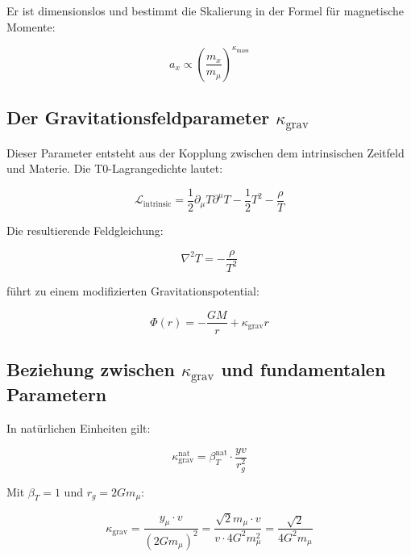 \documentclass[12pt,a4paper]{article}
\theoremstyle{definition}
\begin{document}
	Er ist dimensionslos und bestimmt die Skalierung in der Formel f\"ur magnetische Momente:
	
	\begin{equation}
		a_x \propto \left(\frac{m_x}{m_\mu}\right)^{\kappa_{\text{mass}}}
	\end{equation}
	
	\subsection{Der Gravitationsfeldparameter $\kappa_{\text{grav}}$}
	
	Dieser Parameter entsteht aus der Kopplung zwischen dem intrinsischen Zeitfeld und Materie. Die T0-Lagrangedichte lautet:
	
	\begin{equation}
		\mathcal{L}_{\text{intrinsic}} = \frac{1}{2}\partial_\mu T \partial^\mu T - \frac{1}{2}T^2 - \frac{\rho}{T}
	\end{equation}
	
	Die resultierende Feldgleichung:
	
	\begin{equation}
		\nabla^2 T = -\frac{\rho}{T^2}
	\end{equation}
	
	f\"uhrt zu einem modifizierten Gravitationspotential:
	
	\begin{equation}
		\Phi(r) = -\frac{GM}{r} + \kappa_{\text{grav}} r
	\end{equation}
	
	\subsection{Beziehung zwischen $\kappa_{\text{grav}}$ und fundamentalen Parametern}
	
	In nat\"urlichen Einheiten gilt:
	
	\begin{equation}
		\kappa_{\text{grav}}^{\text{nat}} = \beta_T^{\text{nat}} \cdot \frac{yv}{r_g^2}
	\end{equation}
	
	Mit $\beta_T = 1$ und $r_g = 2Gm_\mu$:
	
	\begin{equation}
		\kappa_{\text{grav}} = \frac{y_\mu \cdot v}{(2Gm_\mu)^2} = \frac{\sqrt{2} m_\mu \cdot v}{v \cdot 4G^2m_\mu^2} = \frac{\sqrt{2}}{4G^2m_\mu}
	\end{equation}
	
\end{document}
